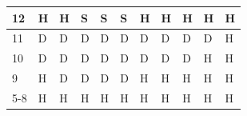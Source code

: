 \documentclass[conference]{IEEEtran}
\begin{document}
\begin{table}[ht]
\begin{tabular}{|l|l|l|l|l|l|l|l|l|l|l|}
12                           & \cellcolor{green!50}H & \cellcolor{green!50}H & \cellcolor{red!75}S & \cellcolor{red!75}S & \cellcolor{red!75}S & \cellcolor{green!50}H & \cellcolor{green!50}H & \cellcolor{green!50}H & \cellcolor{green!50}H & \cellcolor{green!50}H  \\ \hline
11                           & \cellcolor{blue!25}D & \cellcolor{blue!25}D & \cellcolor{blue!25}D & \cellcolor{blue!25}D & \cellcolor{blue!25}D & \cellcolor{blue!25}D & \cellcolor{blue!25}D & \cellcolor{blue!25}D & \cellcolor{blue!25}D & \cellcolor{green!50}H  \\ \hline
10                           & \cellcolor{blue!25}D & \cellcolor{blue!25}D & \cellcolor{blue!25}D & \cellcolor{blue!25}D & \cellcolor{blue!25}D & \cellcolor{blue!25}D & \cellcolor{blue!25}D & \cellcolor{blue!25}D & \cellcolor{green!50}H & \cellcolor{green!50}H \\ \hline
9                            & \cellcolor{green!50}H & \cellcolor{blue!25}D & \cellcolor{blue!25}D & \cellcolor{blue!25}D & \cellcolor{blue!25}D & \cellcolor{green!50}H & \cellcolor{green!50}H & \cellcolor{green!50}H & \cellcolor{green!50}H & \cellcolor{green!50}H  \\ \hline
5-8                          & \cellcolor{green!50}H & \cellcolor{green!50}H & \cellcolor{green!50}H & \cellcolor{green!50}H & \cellcolor{green!50}H & \cellcolor{green!50}H & \cellcolor{green!50}H & \cellcolor{green!50}H & \cellcolor{green!50}H & \cellcolor{green!50}H \\ \hline \hline


\end{tabular}
\end{table}
\end{document}
